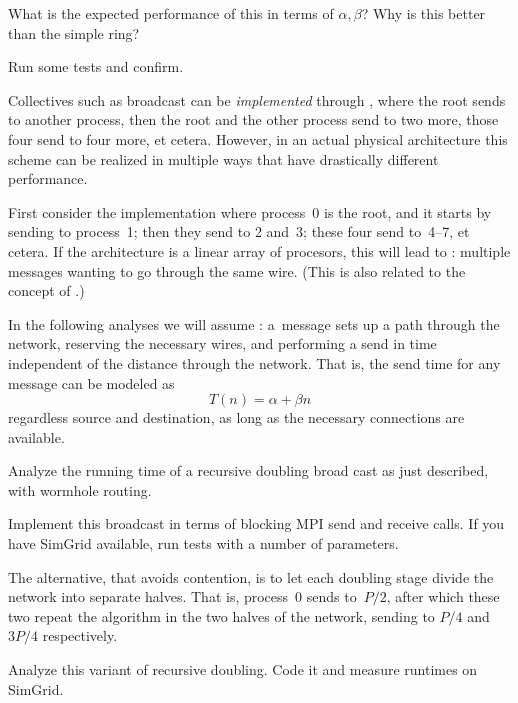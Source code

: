 What is the expected performance of this in terms of $\alpha,\beta$?
Why is this better than the simple ring?

Run some tests and confirm.


Collectives such as broadcast can be
\emph{implemented}
through
%
,
where the root sends to another process, then the root and the other
process send to two more, those four send to four more, et cetera.
However, in an actual physical architecture this scheme can be
realized in multiple ways that have drastically different performance.

First consider the implementation where process~0 is the root, and it
starts by sending to process~1; then they send to 2 and~3; these four
send to~4--7, et cetera. If the architecture is a linear array of
procesors, this will lead to : multiple messages
wanting to go through the same wire. (This is also related to the
concept of .)

In the following analyses we will assume :
a~message sets up a path through the network, reserving the necessary
wires, and performing a send in time independent of the distance
through the network. That is, the send time for any message can be
modeled as \[ T(n)=\alpha+\beta n \] regardless source and
destination, as long as the necessary connections are available. 

\begin{exercise}
  \label{ex:bcast-doubling-block}
  Analyze the running time of a recursive doubling broad cast as just
  described, with wormhole routing.

  Implement this broadcast in terms of blocking MPI send and receive calls.
  If you have SimGrid available, run
  tests with a number of parameters.
\end{exercise}

The alternative, that avoids contention, is to let each doubling stage
divide the network into separate halves. That is, process~0 sends
to~$P/2$, after which these two repeat the algorithm in the two halves
of the network, sending to $P/4$ and $3P/4$ respectively.

\begin{exercise}
  Analyze this variant of recursive doubling. Code it and measure
  runtimes on SimGrid.
\end{exercise}


